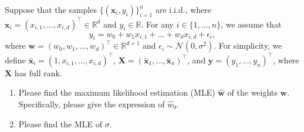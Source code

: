 \documentclass[11pt,letter,notitlepage]{article}
\begin{document}
\newpage



\begin{exercise}\label{Exe5}
Suppose that the samples $\{(\mathbf{x}_i,y_i)\}^n_{i=1}$ are i.i.d., where $\mathbf{x}_i =(x_{i,1}, \dots, x_{i,d})^{\top} \in \mathbb{R}^d$  and $y_i \in \mathbb{R}$. For any $i\in \{1,\dots, n\}$, we assume that 
$$y_i =  w_0 + w_1 x_{i,1} +\dots + w_d x_{i,d} + \epsilon_i,$$
where $\mathbf{w} = (w_0,w_1,\dots,w_d)^{\top}\in \mathbb{R}^{d+1}$ and $\epsilon_i\sim \mathcal{N}(0,\sigma^2)$. For simplicity, we define $\bar{\mathbf{x}}_i = (1, x_{i,1}, \dots, x_{i,d})^\top$, $ \mathbf{X}=(\bar{\mathbf{x}}_1,\dots,\bar{\mathbf{x}}_n)^\top$, and $\mathbf{y}=(y_1,\dots,y_n)^\top$, where $\mathbf{X}$ has full rank.
\begin{enumerate}
    \item Please find the maximum likelihood estimation (MLE) $\hat{\mathbf{w}}$ of the weights $\mathbf{w}$. Specifically, please give the expression of $\hat{w}_0$.
    \item Please find the MLE of $\sigma$.
\end{enumerate}
\end{exercise}
\end{document}
